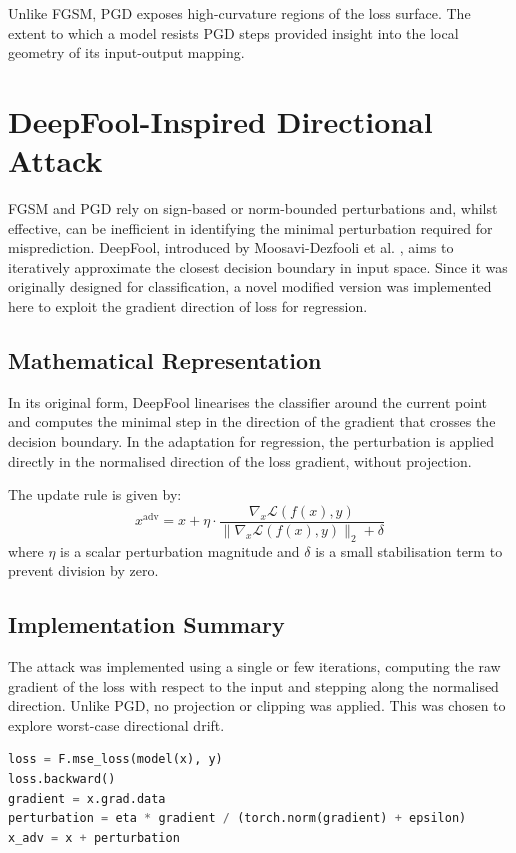 Unlike FGSM, PGD exposes high-curvature regions of the loss surface. The extent to which a model resists PGD steps provided insight into the local geometry of its input-output mapping.

\section{DeepFool-Inspired Directional Attack}

FGSM and PGD rely on sign-based or norm-bounded perturbations and, whilst effective, can be inefficient in identifying the minimal perturbation required for misprediction. DeepFool, introduced by Moosavi-Dezfooli et al. \cite{moosavi2016deepfools}, aims to iteratively approximate the closest decision boundary in input space. Since it was originally designed for classification, a novel modified version was implemented here to exploit the gradient direction of loss for regression.

\subsection*{Mathematical Representation}
In its original form, DeepFool linearises the classifier around the current point and computes the minimal step in the direction of the gradient that crosses the decision boundary. In the adaptation for regression, the perturbation is applied directly in the normalised direction of the loss gradient, without projection.

The update rule is given by:
\[
x^{\text{adv}} = x + \eta \cdot \frac{\nabla_x \mathcal{L}(f(x), y)}{ \| \nabla_x \mathcal{L}(f(x), y) \|_2 + \delta }
\]
where $\eta$ is a scalar perturbation magnitude and $\delta$ is a small stabilisation term to prevent division by zero.

\subsection*{Implementation Summary}
The attack was implemented using a single or few iterations, computing the raw gradient of the loss with respect to the input and stepping along the normalised direction. Unlike PGD, no projection or clipping was applied. This was chosen to explore worst-case directional drift.

\begin{lstlisting}[language=Python, caption={Directional (DeepFool-like) Gradient Attack}]
loss = F.mse_loss(model(x), y)
loss.backward()
gradient = x.grad.data
perturbation = eta * gradient / (torch.norm(gradient) + epsilon)
x_adv = x + perturbation
\end{lstlisting}

